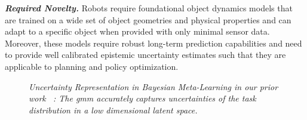 \documentclass{erc-B2}
\begin{document}
\textbf{\textit{Required Novelty.}} Robots require foundational object dynamics models that are trained on a wide set of object geometries and physical properties and can adapt to a specific object when provided with only minimal sensor data. Moreover, these models require robust long-term prediction capabilities and need to provide well calibrated epistemic uncertainty estimates such that they are applicable to planning and policy optimization.  

\begin{figure}
     \caption{\small \textit{Uncertainty Representation in Bayesian Meta-Learning in our prior work ~\cite{Volpp23}: The \gls*{gmm} accurately captures uncertainties of the task distribution in a low dimensional latent space.   }} 
  \label{fig:latent}
\end{figure}
\end{document}
